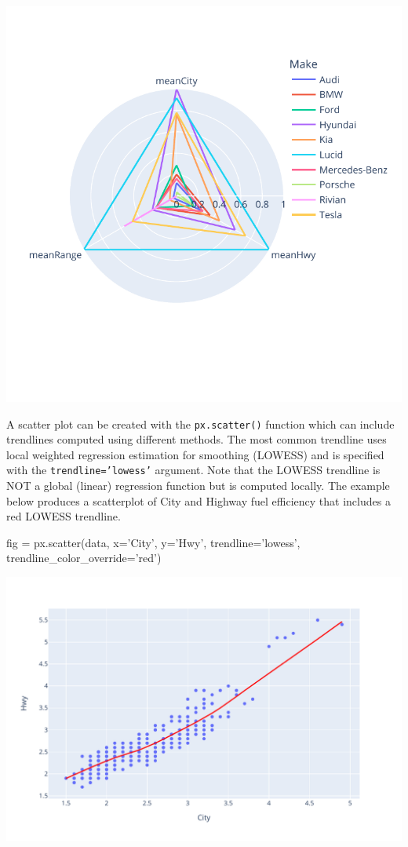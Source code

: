 \begin{center}
  \includegraphics[width=.8\textwidth]{px.fuel.radar.pdf}
\end{center}

A scatter plot can be created with the \texttt{px.scatter()} function which can include trendlines computed using different methods. The most common trendline uses local weighted regression estimation for smoothing (LOWESS) and is specified with the \texttt{trendline='lowess'} argument. Note that the LOWESS trendline is NOT a global (linear) regression function but is computed locally. The example below produces a scatterplot of City and Highway fuel efficiency that includes a red LOWESS trendline. 

\begin{samepage}
\begin{pythoncode}
fig = px.scatter(data, 
    x='City', y='Hwy', 
    trendline='lowess',
    trendline_color_override='red')
\end{pythoncode}
\end{samepage}

\begin{center}
  \includegraphics[width=.8\textwidth]{px.fuel.linesSmooth.pdf}
\end{center}

